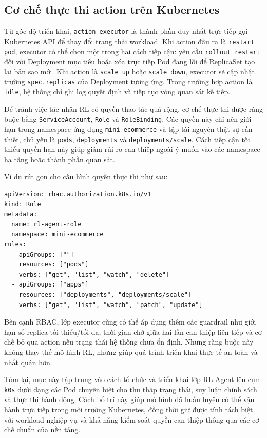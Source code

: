 \subsection{Cơ chế thực thi action trên Kubernetes}

Từ góc độ triển khai, \texttt{action-executor} là thành phần duy nhất trực tiếp gọi Kubernetes API để thay đổi trạng thái workload. Khi action đầu ra là \texttt{restart pod}, executor có thể chọn một trong hai cách tiếp cận: yêu cầu \texttt{rollout restart} đối với Deployment mục tiêu hoặc xóa trực tiếp Pod đang lỗi để ReplicaSet tạo lại bản sao mới. Khi action là \texttt{scale up} hoặc \texttt{scale down}, executor sẽ cập nhật trường \texttt{spec.replicas} của Deployment tương ứng. Trong trường hợp action là \texttt{idle}, hệ thống chỉ ghi log quyết định và tiếp tục vòng quan sát kế tiếp.

\noindent Để tránh việc tác nhân RL có quyền thao tác quá rộng, cơ chế thực thi được ràng buộc bằng \texttt{ServiceAccount}, \texttt{Role} và \texttt{RoleBinding}. Các quyền này chỉ nên giới hạn trong namespace ứng dụng \texttt{mini-ecommerce} và tập tài nguyên thật sự cần thiết, chủ yếu là \texttt{pods}, \texttt{deployments} và \texttt{deployments/scale}. Cách tiếp cận tối thiểu quyền hạn này giúp giảm rủi ro can thiệp ngoài ý muốn vào các namespace hạ tầng hoặc thành phần quan sát.

\newpage
\noindent Ví dụ rút gọn cho cấu hình quyền thực thi như sau:
\begin{lstlisting}
apiVersion: rbac.authorization.k8s.io/v1
kind: Role
metadata:
  name: rl-agent-role
  namespace: mini-ecommerce
rules:
  - apiGroups: [""]
    resources: ["pods"]
    verbs: ["get", "list", "watch", "delete"]
  - apiGroups: ["apps"]
    resources: ["deployments", "deployments/scale"]
    verbs: ["get", "list", "watch", "patch", "update"]
\end{lstlisting}

\noindent Bên cạnh RBAC, lớp executor cũng có thể áp dụng thêm các guardrail như giới hạn số replica tối thiểu/tối đa, thời gian chờ giữa hai lần can thiệp liên tiếp và cơ chế bỏ qua action nếu trạng thái hệ thống chưa ổn định. Những ràng buộc này không thay thế mô hình RL, nhưng giúp quá trình triển khai thực tế an toàn và nhất quán hơn.

\noindent Tóm lại, mục này tập trung vào cách tổ chức và triển khai lớp RL Agent lên cụm \texttt{k0s} dưới dạng các Pod chuyên biệt cho thu thập trạng thái, suy luận chính sách và thực thi hành động. Cách bố trí này giúp mô hình đã huấn luyện có thể vận hành trực tiếp trong môi trường Kubernetes, đồng thời giữ được tính tách biệt với workload nghiệp vụ và khả năng kiểm soát quyền can thiệp thông qua các cơ chế chuẩn của nền tảng.
